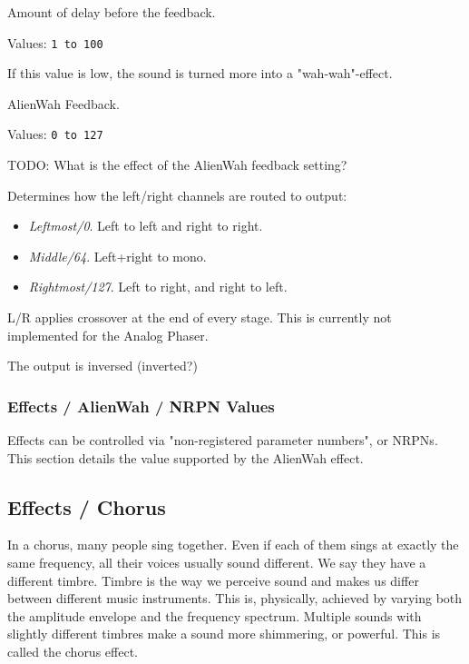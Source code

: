   Amount of delay before the feedback.

   Values: \texttt{1 to 100}

   If this value is low, the sound is turned more into a "wah-wah"-effect.

   AlienWah Feedback.

   Values: \texttt{0 to 127}

   TODO: What is the effect of the AlienWah feedback setting?

   Determines how the left/right channels are routed to output:

   \begin{itemize}
      \item \textsl{Leftmost/0}. Left to left and right to right.
      \item \textsl{Middle/64}. Left+right to mono.
      \item \textsl{Rightmost/127}. Left to right, and right to left.
   \end{itemize}

   L/R applies crossover at the end of every stage. This is currently not
   implemented for the Analog Phaser.

   The output is inversed (inverted?)

\subsubsection{Effects / AlienWah / NRPN Values}
\label{subsubsec:effects_edit_alienwah_nrpn}

Effects can be controlled via "non-registered parameter numbers", or NRPNs.
This section details the value supported by the AlienWah effect.

\subsection{Effects / Chorus}
\label{subsec:effects_edit_chorus}

   In a chorus, many people sing together. Even if each of them sings at
   exactly the same frequency, all their voices usually sound different. We
   say they have a different timbre. Timbre is the way we perceive sound and
   makes us differ between different music instruments. This is, physically,
   achieved by varying both the amplitude envelope and the frequency
   spectrum. Multiple sounds with slightly different timbres make a sound
   more shimmering, or powerful. This is called the chorus effect.

